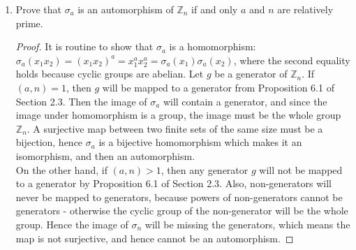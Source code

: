 \documentclass{article}
\begin{document}
\begin{enumerate}
\begin{enumerate}
        \begin{enumerate}
          \item Prove that $\sigma_a$ is an automorphism of $\mathbb{Z}_n$
            if and only $a$ and $n$ are relatively prime.
            \label{qn:rel-prime}
            \begin{proof}
              It is routine to show that $\sigma_a$ is a homomorphism:
              $\sigma_a(x_1x_2)=(x_1x_2)^a=x_1^ax_2^a=\sigma_a(x_1)\sigma_a(x_2)$,
              where the second equality holds because cyclic groups are
              abelian. Let $g$ be a generator of $\mathbb{Z}_n$. If
              $(a,n)=1$, then $g$ will be mapped to a generator from
              Proposition 6.1 of Section 2.3. Then the image of $\sigma_a$
              will contain a generator, and since the image under
              homomorphism is a group, the image must be the whole group
              $\mathbb{Z}_n$. A surjective map between two finite sets of the
              same size must be a bijection, hence $\sigma_a$ is a
              bijective homomorphism which makes it an isomorphism, and
              then an automorphism. \\

              On the other hand, if $(a,n)>1$, then any generator $g$ will
              not be mapped to a generator by Proposition 6.1 of Section
              2.3. Also, non-generators will never be mapped to generators,
              because powers of non-generators cannot be generators -
              otherwise the cyclic group of the non-generator will be the
              whole group. Hence the image of $\sigma_n$ will be missing
              the generators, which means the map is not surjective, and
              hence cannot be an automorphism.
            \end{proof}


\end{enumerate}
\end{enumerate}
\end{enumerate}
\end{document}
